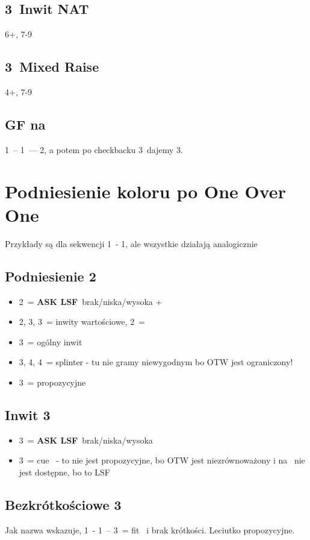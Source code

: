 \documentclass[12pt, a4paper]{article}
\newcommand{\lsf}{\color{WildStrawberry}\textbf{ASK LSF}\color{black}}
\begin{document}
\subsection*{3\clubs\ Inwit NAT}
6+\clubs, 7-9

\subsection*{3\diams\ Mixed Raise}
4+\diams, 7-9

\subsection*{GF na \diams}
1\diams\ -- 1\spades\ --- 2\nt, a potem po checkbacku 3\clubs\ dajemy 3\diams.


\pagebreak
\section{Podniesienie koloru po One Over One}
Przykłady są dla sekwencji 1\clubs\ - 1\hearts, ale wszystkie działają analogicznie
\subsection*{Podniesienie 2\hearts}
\begin{itemize}
    \item 2\spades\ = \lsf\ brak/niska/wysoka \inv+
    \item 2\nt, 3\clubs, 3\diams\ = inwity wartościowe, 2\nt\ = \spades
    \item 3\hearts\ = ogólny inwit
    \item 3\spades, 4\clubs, 4\diams\ = splinter - tu nie gramy niewygodnym bo OTW jest ograniczony!
    \item 3\nt\ = propozycyjne
\end{itemize}

\subsection*{Inwit 3\hearts}
\begin{itemize}
    \item 3\spades\ = \lsf\ brak/niska/wysoka
    \item 3\nt\ = cue \spades\ - to nie jest propozycyjne, bo OTW jest niezrównoważony i na \spades\ nie jest dostępne, bo to LSF
\end{itemize}

\subsection*{Bezkrótkościowe 3\ntx}
Jak nazwa wskazuje, 1\clubs\ - 1\hearts\ -- 3\nt\ = fit \hearts\ i brak krótkości. Leciutko propozycyjne.
\end{document}
